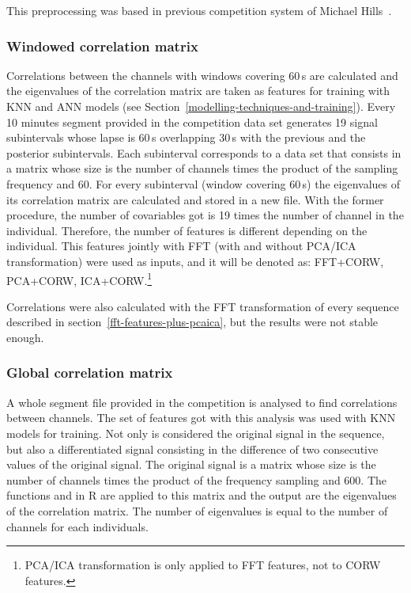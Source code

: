 \documentclass[a4paper,english,twoside]{article}
\begin{document}
This preprocessing was based in previous competition system of Michael
Hills~\cite{michaelhills}.

\subsubsection{Windowed correlation
  matrix}\label{windowed-correlation-matrix}

Correlations between the channels with windows covering 60\,s are calculated and
the eigenvalues of the correlation matrix are taken as features for training
with KNN and ANN models (see Section~\ref{modelling-techniques-and-training}).
Every 10 minutes segment provided in the competition data set generates 19
signal subintervals whose lapse is 60\,s overlapping 30\,s with the previous and
the posterior subintervals.  Each subinterval corresponds to a data set that
consists in a matrix whose size is the number of channels times the product of
the sampling frequency and 60.  For every subinterval (window covering 60\,s)
the eigenvalues of its correlation matrix are calculated and stored in a new
file. With the former procedure, the number of covariables got is 19 times the
number of channel in the individual.  Therefore, the number of features is
different depending on the individual. This features jointly with FFT (with and
without PCA/ICA transformation) were used as inputs, and it will be denoted as:
FFT+CORW, PCA+CORW, ICA+CORW.\footnote{PCA/ICA transformation is only applied to
  FFT features, not to CORW features.}

Correlations were also calculated with the FFT transformation of every
sequence described in section~\ref{fft-features-plus-pcaica},
but the results were not stable enough.

\subsubsection{Global correlation
  matrix}\label{global-correlation-matrix}

A whole segment file provided in the competition is analysed to find
correlations between channels.  The set of features got with this analysis was
used with KNN models for training.  Not only is considered the original signal
in the sequence, but also a differentiated signal consisting in the difference
of two consecutive values of the original signal. The original signal is a
matrix whose size is the number of channels times the product of the frequency
sampling and 600. The functions \verb@eigen@ and \verb@cor@ in R are applied to
this matrix and the output are the eigenvalues of the correlation matrix. The
number of eigenvalues is equal to the number of channels for each individuals.
\end{document}
